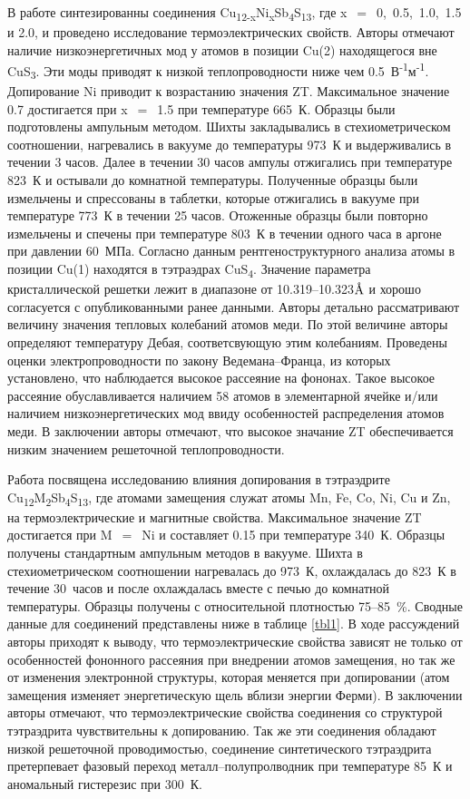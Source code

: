 В работе \cite{Suekuni_2013} синтезированны  соединения Cu\textsubscript{12-x}Ni\textsubscript{x}Sb\textsubscript{4}S\textsubscript{13}, где x~$=$~0,~0.5,~1.0,~1.5 и 2.0, и проведено исследование термоэлектрических свойств. Авторы отмечают наличие низкоэнергетичных мод у атомов в позиции Cu(2) находящегося вне CuS\textsubscript{3}. Эти моды приводят к низкой теплопроводности ниже чем 0.5~В\textsuperscript{-1}м\textsuperscript{-1}. Допирование Ni приводит к возрастанию значения ZT. Максимальное значение 0.7 достигается при x~$=$~1.5 при температуре 665~К. Образцы были подготовлены ампульным методом. Шихты закладывались в стехиометрическом соотношении, нагревались в вакууме до температуры 973~К и выдерживались в течении 3 часов. Далее в течении 30 часов ампулы отжигались при температуре 823~К и остывали до комнатной температуры. Полученные образцы были измельчены и спрессованы в таблетки, которые отжигались в вакууме при температуре 773~К в течении 25 часов. Отоженные образцы были повторно измельчены и спечены при температуре 803~К в течении одного часа в аргоне при давлении 60~МПа. Согласно данным рентгеноструктурного анализа атомы в позиции Cu(1) находятся в тэтраэдрах CuS\textsubscript{4}. Значение параметра кристаллической решетки лежит в диапазоне от 10.319--10.323$\mbox{\normalfont\AA}$ и хорошо согласуется с опубликованными ранее данными. Авторы детально рассматривают величину значения тепловых колебаний атомов меди. По этой величине авторы определяют температуру Дебая, соответсвующую этим колебаниям. Проведены оценки электропроводности по закону Ведемана--Франца, из которых установлено, что наблюдается высокое рассеяние на фононах. Такое высокое рассеяние обуславливается наличием 58 атомов в элементарной ячейке и/или наличием низкоэнергетических мод ввиду особенностей распределения атомов меди. В заключении авторы отмечают, что высокое значание ZT обеспечивается низким значением решеточной теплопроводности. 

Работа \cite{Suekuni2012} посвящена исследованию влияния допирования в тэтраэдрите Cu\textsubscript{12}M\textsubscript{2}Sb\textsubscript{4}S\textsubscript{13}, где атомами замещения служат атомы Mn, Fe, Co, Ni, Cu и Zn, на термоэлектрические и магнитные свойства.
Максимальное значение ZT достигается при M~$=$~Ni и составляет 0.15 при температуре 340~К.
Образцы получены стандартным ампульным методов в вакууме. Шихта в стехиометрическом соотношении нагревалась до 973~К, охлаждалась до 823~К в течение 30~часов и после охлаждалась вместе с печью до комнатной температуры. 
Образцы получены с относительной плотностью 75--85~\%. 
Сводные данные для соединений представлены ниже в таблице \ref{tbl1}. 
В ходе рассуждений авторы приходят к выводу, что термоэлектрические свойства зависят не только от особенностей фононного рассеяния при внедрении атомов замещения, но так же от изменения электронной структуры, которая меняется при допировании (атом замещения изменяет энергетическую щель вблизи энергии Ферми).
В заключении авторы отмечают, что термоэлектрические свойства соединения со структурой тэтраэдрита чувствительны к допированию. Так же эти соединения обладают низкой решеточной проводимостью, соединение синтетического тэтраэдрита претерпевает фазовый переход металл--полупролводник при температуре 85~К и аномальный гистерезис при 300~К.


